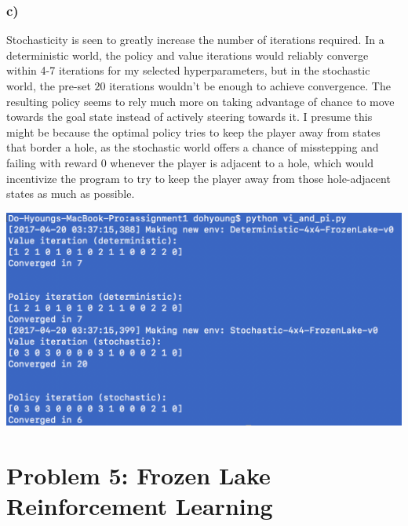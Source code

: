 \documentclass[11pt]{scrartcl}
\begin{document}
\subsubsection*{c)}
Stochasticity is seen to greatly increase the number of iterations required. In a deterministic world, the policy and value iterations would reliably converge within 4-7 iterations for my selected hyperparameters, but in the stochastic world, the pre-set $20$ iterations wouldn't be enough to achieve convergence. The resulting policy seems to rely much more on taking advantage of chance to move towards the goal state instead of actively steering towards it. I presume this might be because the optimal policy tries to keep the player away from states that border a hole, as the stochastic world offers a chance of misstepping and failing with reward $0$ whenever the player is adjacent to a hole, which would incentivize the program to try to keep the player away from those hole-adjacent states as much as possible.

\begin{center}
\includegraphics[width=\textwidth]{PS1Q4.png}
\end{center}

\section*{Problem 5: Frozen Lake Reinforcement Learning}
\end{document}
